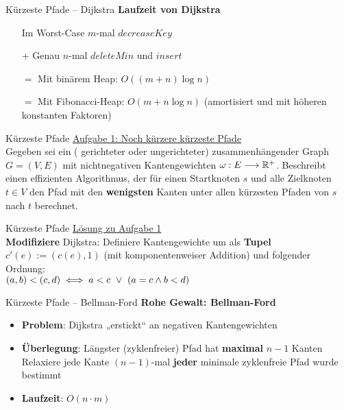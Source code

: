 \fi

\begin{frame}{Kürzeste Pfade – Dijkstra}
	\textbf{Laufzeit von Dijkstra} 
	\begin{itemize}
		\item[] Im Worst-Case $m$-mal $decreaseKey$
		\item[$+$] Genau $n$-mal $deleteMin$ und $insert$
		\pause
		\item[$=$] Mit binärem Heap: $O\left((m+n)\log n\right)$
		\pause
		\item[$=$] Mit Fibonacci-Heap: $O(m + n \log n)$ \quad (amortisiert und mit höheren konstanten Faktoren)
	\end{itemize}
\end{frame}

\begin{frame}{Kürzeste Pfade}
	\underline{Aufgabe 1: Noch kürzere kürzeste Pfade} \\
	Gegeben sei ein ( gerichteter oder ungerichteter) zusammenhängender Graph $G = (V, E)$ mit nichtnegativen Kantengewichten $\omega : E \longrightarrow \mathbb{R}^{+}$. Beschreibt einen effizienten Algorithmus, der für einen Startknoten $s$ und alle Zielknoten $t \in V$ den Pfad mit den \textbf{wenigsten} Kanten unter allen kürzesten Pfaden von $s$ nach $t$ berechnet.
\end{frame}

\begin{frame}{Kürzeste Pfade}
	\underline{Lösung zu Aufgabe 1} \\
	\textbf{Modifiziere} Dijkstra: Definiere Kantengewichte um als \textbf{Tupel} $c'(e) := \left(c(e), 1\right)$ (mit komponentenweiser Addition) und folgender Ordnung: \\ $(a, b) < (c, d) \Gdw a < c \ \lor\  (a = c \land b < d)$ 
\end{frame}

\begin{frame}{Kürzeste Pfade – Bellman-Ford}
	\textbf{Rohe Gewalt: Bellman-Ford} 
	\begin{itemize}
		\pause
		\item \textbf{Problem}: Dijkstra „erstickt“ an negativen Kantengewichten
		\pause
		\item \textbf{Überlegung}: Längster (zyklenfreier) Pfad hat \textbf{maximal} $n-1$ Kanten
		\pause
		\implitem Relaxiere jede Kante $(n-1)$-mal \impl \textbf{jeder} minimale zyklenfreie Pfad wurde bestimmt
		\pause
		\item \textbf{Laufzeit}: $O(n \cdot m)$
	\end{itemize}
\end{frame}

